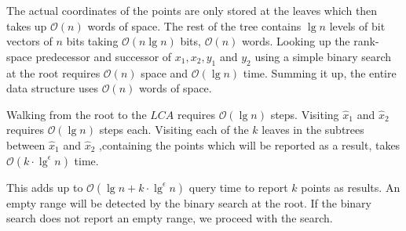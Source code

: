 
The actual coordinates of the points are only stored at the leaves which then takes up $\mathcal{O}(n)$  words of space. The rest of the tree contains $\lg n$ levels of bit vectors of $n$ bits taking $\mathcal{O}(n \lg n)$ bits, $\mathcal{O}(n)$ words. Looking up the rank-space predecessor and successor of $x_1, x_2, y_1$ and $y_2$ using a simple binary search at the root requires $\mathcal{O}(n)$ space and $\mathcal{O}(\lg n)$ time. Summing it up, the entire data structure uses $\mathcal{O}(n)$ words of space. 

Walking from the root to the $LCA$ requires $\mathcal{O}(\lg n)$ steps. Visiting $\hat{x}_1$ and $\hat{x}_2$ requires $\mathcal{O}(\lg n)$ steps each. Visiting each of the $k$ leaves in the subtrees between $\hat{x}_1$ and $\hat{x}_2$ ,containing the points which will be reported as a result, takes $\mathcal{O}(k \cdot \lg^\epsilon n)$ time.

This adds up to $\mathcal{O}(\lg n + k\cdot\lg^\epsilon n)$ query time to report $k$ points as results. An empty range will be detected by the binary search at the root. If the binary search does not report an empty range, we proceed with the search. 

